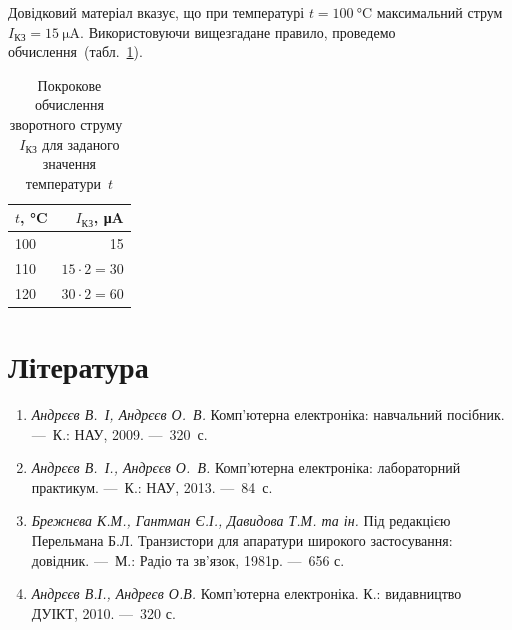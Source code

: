 \documentclass[14pt,ukrainian,utf8,simple]{eskdtext}
\let\stdsection\section
\renewcommand\section{\newpage\stdsection}
\begin{document}
		Довідковий матеріал вказує, що при температурі $t = \SI{100}{\degreeCelsius}$ максимальний струм~$I_{\text{КЗ}} = \SI{15}{\micro\ampere}$. Використовуючи вищезгадане правило, проведемо обчислення~(табл.~\ref{tab:i-kz-computation}).
		\begin{longtable}[c]{|l|r|}
			\hline
				$t$, \si{\degreeCelsius} & $I_{\text{КЗ}}$, \si{\micro\ampere}\\
			\hline
			\endhead
			\hline
			\caption{Покрокове обчислення зворотного струму~$I_{\text{КЗ}}$ для заданого значення температури~$t$}
			\label{tab:i-kz-computation}
			\endfoot
			
			100 & 15\\
			\hline
			110 & $15 \cdot 2 = 30$\\
			\hline
			120 & $30 \cdot 2 = 60$\\
		\end{longtable}
		
	\section*{Література}
		\begin{enumerate}[label=\arabic*.]
			\item \textit{Андрєєв В.~І, Андрєєв О.~В.} Комп'ютерна електроніка: навчальний посібник. —~К.: НАУ, 2009. —~320~с.
			\item \textit{Андрєєв В.~І., Андрєєв О.~В.} Комп'ютерна електроніка: лабораторний практикум. —~К.: НАУ, 2013. —~84~с.
			\item \textit{Брежнєва К.М., Гантман Є.І., Давидова Т.М. та ін.} Під редакцією Перельмана Б.Л. Транзистори для апаратури широкого застосування: довідник. —~М.: Радіо та зв’язок, 1981р. —~656 с.
			\item \textit{Андрєєв В.І., Андреєв О.В.} Комп’ютерна електроніка. К.: видавництво ДУІКТ, 2010. —~320 с.
		\end{enumerate}
		
	\newpage
	
	\renewcommand{\ESKDtheColumnII}{НАУ 16 2824000 ПЗ}
	
	\tableofcontents
	
\end{document}
